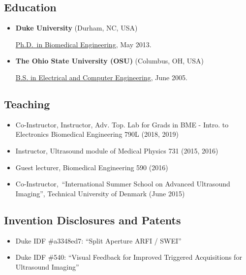 \documentclass[
]{article}
\providecommand{\tightlist}{%
  \setlength{\itemsep}{0pt}\setlength{\parskip}{0pt}}
\begin{document}
\hypertarget{education}{%
\subsection{Education}\label{education}}

\begin{itemize}
\item
  \textbf{Duke University} (Durham, NC, USA)

  \href{http://bme.duke.edu/grad}{Ph.D.~in Biomedical Engineering}, May
  2013.
\item
  \textbf{The Ohio State University (OSU)} (Columbus, OH, USA)

  \href{http://ece.osu.edu/futurestudents/undergrad}{B.S. in Electrical
  and Computer Engineering}, June 2005.
\end{itemize}

\hypertarget{teaching}{%
\subsection{Teaching}\label{teaching}}

\begin{itemize}
\tightlist
\item
  Co-Instructor, Instructor, Adv. Top. Lab for Grads in BME - Intro. to
  Electronics Biomedical Engineering 790L (2018, 2019)
\item
  Instructor, Ultrasound module of Medical Physics 731 (2015, 2016)
\item
  Guest lecturer, Biomedical Engineering 590 (2016)
\item
  Co-Instructor,~``International Summer School on Advanced Ultrasound
  Imaging'', Technical University of Denmark (June 2015)
\end{itemize}

\hypertarget{invention-disclosures-and-patents}{%
\subsection{Invention Disclosures and
Patents}\label{invention-disclosures-and-patents}}

\begin{itemize}
\tightlist
\item
  Duke IDF \#a3348ed7: ``Split Aperture ARFI / SWEI''
\item
  Duke IDF \#540: ``Visual Feedback for Improved Triggered Acquisitions
  for Ultrasound Imaging''
\end{itemize}
\end{document}
